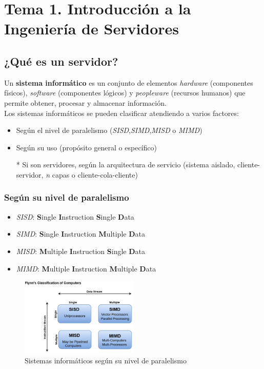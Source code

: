 \documentclass[12pt,spanish]{article}
\begin{document}
\section{Tema 1. Introducción a la Ingeniería de Servidores}

\subsection{¿Qué es un servidor?}

Un \textbf{sistema informático} es un conjunto de elementos \textit{hardware} (componentes físicos), \textit{software} (componentes lógicos) y \textit{peopleware} (recursos humanos) que permite obtener, procesar y almacenar información.\\
Los sistemas informáticos se pueden clasificar atendiendo a varios factores:
\begin{itemize}
	\item Según el nivel de paralelismo (\textit{SISD},\textit{SIMD},\textit{MISD} o \textit{MIMD})
	\item Según su uso (propósito general o específico)
	\item[*] Si son servidores, según la arquitectura de servicio (sistema aislado, cliente-servidor, \emph{n} capas o cliente-cola-cliente)
\end{itemize}

\subsubsection{Según su nivel de paralelismo}

\begin{itemize}
	\item \textit{SISD}: \textbf{S}ingle \textbf{I}nstruction \textbf{S}ingle \textbf{D}ata
	\item \textit{SIMD}: \textbf{S}ingle \textbf{I}nstruction \textbf{M}ultiple \textbf{D}ata
	\item \textit{MISD}: \textbf{M}ultiple \textbf{I}nstruction  \textbf{S}ingle \textbf{D}ata
	\item \textit{MIMD}: \textbf{M}ultiple \textbf{I}nstruction  \textbf{M}ultiple \textbf{D}ata
\end{itemize}
\begin{figure}[H]
	\centering
	\includegraphics[width=0.5\textwidth]{comparacion_paralelismo.png}
	\caption{Sistemas informáticos según su nivel de paralelismo}
\end{figure}
\end{document}
